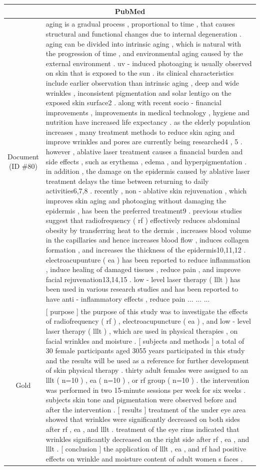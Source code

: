 \begin{table}[bth!]
\scriptsize
\centering
\renewcommand{\arraystretch}{1.3}
\begin{tabular}{c|p{}}
\hline
\multicolumn{2}{c}{PubMed} \\ \hline
\makecell{Document\\(ID \#80)} & 
aging is a gradual process , proportional to time , that causes structural and functional changes due to internal degeneration . aging can be divided into intrinsic aging , which is natural with the progression of time , and environmental aging caused by the external environment . uv - induced photoaging is usually observed on skin that is exposed to the sun . its clinical characteristics include earlier observation than intrinsic aging , deep and wide wrinkles , inconsistent pigmentation and solar lentigo on the exposed skin surface2 . along with recent socio - financial improvements , improvements in medical technology , hygiene and nutrition have increased life expectancy . as the elderly population increases , many treatment methods to reduce skin aging and improve wrinkles and pores are currently being researched4 , 5 . however , ablative laser treatment causes a financial burden and side effects , such as erythema , edema , and hyperpigmentation . in addition , the damage on the epidermis caused by ablative laser treatment delays the time between returning to daily activities6,7,8 . recently , non - ablative skin rejuvenation , which improves skin aging and photoaging without damaging the epidermis , has been the preferred treatment9 . previous studies suggest that radiofrequency ( rf ) effectively reduces abdominal obesity by transferring heat to the dermis , increases blood volume in the capillaries and hence increases blood flow , induces collagen formation , and increases the thickness of the epidermis10,11,12 . electroacupunture ( ea ) has been reported to reduce inflammation , induce healing of damaged tissues , reduce pain , and improve facial rejuvenation13,14,15 . low - level laser therapy ( lllt ) has been used in various research studies and has been reported to have anti - inflammatory effects , reduce pain ... ... ... 
\\ \hline
Gold & 
[ purpose ] the purpose of this study was to investigate the effects of radiofrequency ( rf ) , electroacupuncture ( ea ) , and low - level laser therapy ( lllt ) , which are used in physical therapies , on facial wrinkles and moisture . [ subjects and methods ] a total of 30 female participants aged 3055 years participated in this study and the results will be used as a reference for further development of skin physical therapy . thirty adult females were assigned to an lllt ( n=10 ) , ea ( n=10 ) , or rf group ( n=10 ) . the intervention was performed in two 15-minute sessions per week for six weeks . subjects skin tone and pigmentation were observed before and after the intervention . [ results ] treatment of the under eye area showed that wrinkles were significantly decreased on both sides after rf , ea , and lllt . treatment of the eye rims indicated that wrinkles significantly decreased on the right side after rf , ea , and lllt . [ conclusion ] the application of lllt , ea , and rf had positive effects on wrinkle and moisture content of adult women s faces .

\end{tabular}
\end{table}
